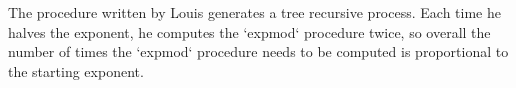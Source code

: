 The procedure written by Louis generates a tree recursive process.  Each time he halves the exponent, he computes the `expmod` procedure twice, so overall the number of times the `expmod` procedure needs to be computed is proportional to the starting exponent.

